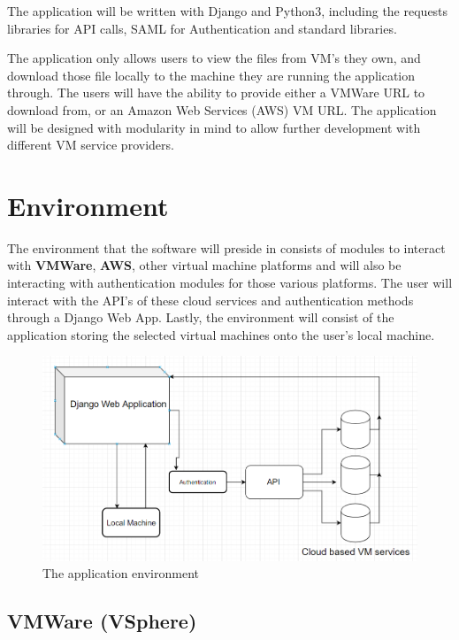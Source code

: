 \documentclass{article}
\begin{document}
    The application will be written with Django and Python3, including the requests libraries for API calls, SAML for Authentication
    and standard libraries.

    The application only allows users to view the files from VM's they own, and download those file locally to the machine they 
    are running the application through. The users will have the ability to provide either a VMWare URL to download from, or an
    Amazon Web Services (AWS) VM URL. The application will be designed with modularity in mind to allow further 
    development with different VM service providers.  


    \section{Environment}
    The environment that the software will preside in consists of modules to interact with \textbf{VMWare}, 
    \textbf{AWS}, other virtual machine platforms and will also be interacting with authentication modules for those
    various platforms. The user will interact with the API's of these cloud services and authentication
    methods through a Django Web App. Lastly, the environment will consist of the application storing the selected
    virtual machines onto the user's local machine.

    \begin{figure}[h]
    \includegraphics[scale=.7]{diagram}
        \caption{The application environment}
    \end{figure}

        \subsection{VMWare (VSphere)}
\end{document}
